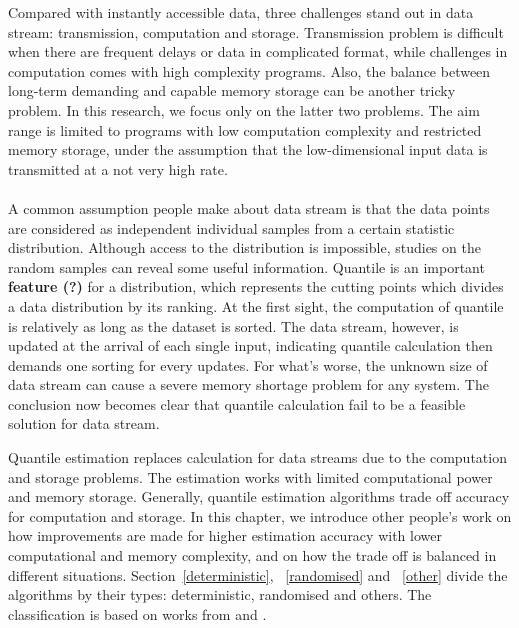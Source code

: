Compared with instantly accessible data, three challenges stand out in data stream: transmission, computation and storage\cite{muthukrishnanDataStreamsAlgorithms2005}.
Transmission problem is difficult when there are frequent delays or data in complicated format,
while challenges in computation comes with high complexity programs. Also, the balance between long-term demanding and capable memory storage can be another tricky problem.
In this research, we focus only on the latter two problems. The aim range is limited to programs with low computation complexity and restricted memory storage, under the assumption that the low-dimensional input data is transmitted at a not very high rate.
\\\\
A common assumption people make about data stream is that the data points are considered as independent individual samples from a certain statistic distribution. 
Although access to the distribution is impossible, studies on the random samples can reveal some useful information. 
Quantile is an important \textbf{feature (?)} for a distribution, which represents the cutting points which divides a data distribution by its ranking.
At the first sight, the computation of quantile is relatively as long as the dataset is sorted.
The data stream, however, is updated at the arrival of each single input, indicating quantile calculation then demands one sorting for every updates.
For what's worse, the unknown size of data stream can cause a severe memory shortage problem for any system. 
The conclusion now becomes clear that quantile calculation fail to be a feasible solution for data stream.

Quantile estimation replaces calculation for data streams due to the computation and storage problems.
The estimation works with limited computational power and memory storage.
Generally, quantile estimation algorithms trade off accuracy for computation and storage.
In this chapter, we introduce other people's work on how improvements are made for higher estimation accuracy with lower computational and memory complexity, and on how the trade off is balanced in different situations. Section~\ref{deterministic}, ~\ref{randomised} and ~\ref{other} divide the algorithms by their types: deterministic, randomised and others. The classification is based on works from \citeauthor{buragohainQuantilesStreams2009}\cite{buragohainQuantilesStreams2009} and \citeauthor{wangQuantilesDataStreams2013}\cite{wangQuantilesDataStreams2013}.

